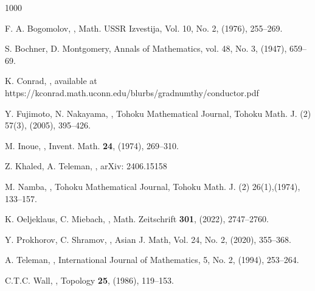 \documentclass[12pt]{amsart}
\begin{document}
\begin{thebibliography}{1000}

\newblock F. A. Bogomolov,
,
\newblock Math. USSR Izvestija, Vol. 10, No. 2, (1976), 255--269.

\newblock  S. Bochner, D. Montgomery, 
\newblock Annals of Mathematics, vol. 48, No. 3, (1947), 659--69.

\newblock K. Conrad,
,
\newblock available at\\https://kconrad.math.uconn.edu/blurbs/gradnumthy/conductor.pdf

\newblock Y. Fujimoto, N. Nakayama,
,
\newblock Tohoku Mathematical Journal, Tohoku Math. J. (2) 57(3), (2005), 395--426.

\newblock M. Inoue, 
, 
\newblock Invent. Math. {\bf 24},  (1974), 269--310.

\newblock Z. Khaled, A. Teleman,
,
\newblock arXiv: 2406.15158

\newblock M. Namba,
,
\newblock Tohoku Mathematical Journal, Tohoku Math. J. (2) 26(1),(1974), 133--157.

\newblock  K. Oeljeklaus, C. Miebach,
,
\newblock Math. Zeitschrift {\bf 301},  (2022),  2747--2760.

\newblock Y. Prokhorov, C. Shramov,
,
\newblock Asian J. Math, Vol. 24, No. 2, (2020), 355--368.

\newblock A. Teleman,
,
\newblock International Journal of Mathematics, 5, No. 2, (1994), 253--264.

\newblock  C.T.C. Wall,
,
\newblock Topology {\bf 25}, (1986), 119--153.

\end{thebibliography}
\end{document}
